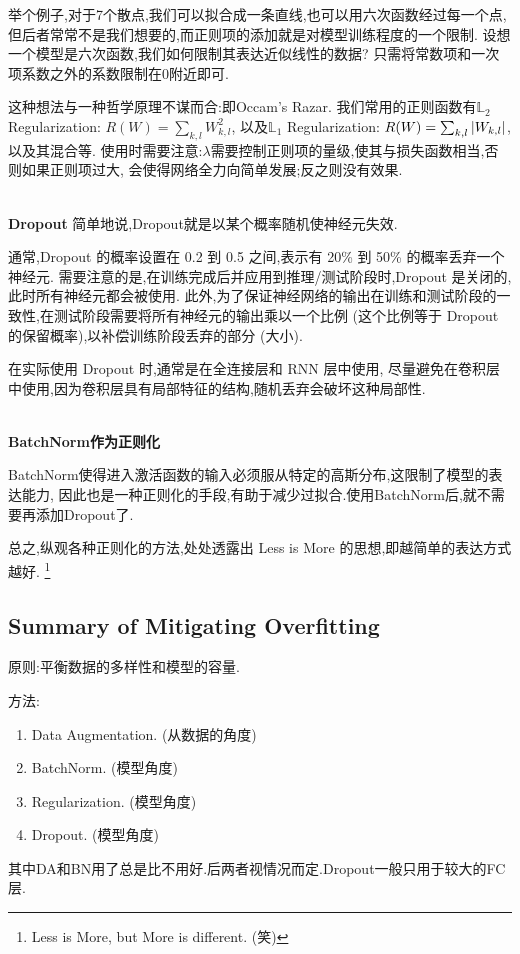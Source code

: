 举个例子,对于7个散点,我们可以拟合成一条直线,也可以用六次函数经过每一个点,
但后者常常不是我们想要的,而正则项的添加就是对模型训练程度的一个限制.
设想一个模型是六次函数,我们如何限制其表达近似线性的数据?
只需将常数项和一次项系数之外的系数限制在0附近即可.

这种想法与一种哲学原理不谋而合:即Occam's Razar.
我们常用的正则函数有$\mathbb L_2$ Regularization: $R(W) = \sum_{k,l}W_{k, l}^2$,
以及$\mathbb L_1$ Regularization: $R(W) = \sum_{k,l}\left|W_{k, l} \right|$,以及其混合等.
使用时需要注意:$\lambda$需要控制正则项的量级,使其与损失函数相当,否则如果正则项过大,
会使得网络全力向简单发展;反之则没有效果.

\textbf{\\Dropout}
简单地说,Dropout就是以某个概率随机使神经元失效.

通常,Dropout 的概率设置在 0.2 到 0.5 之间,表示有 20\% 到 50\% 的概率丢弃一个神经元.
需要注意的是,在训练完成后并应用到推理/测试阶段时,Dropout 是关闭的,此时所有神经元都会被使用.
此外,为了保证神经网络的输出在训练和测试阶段的一致性,在测试阶段需要将所有神经元的输出乘以一个比例
(这个比例等于 Dropout 的保留概率),以补偿训练阶段丢弃的部分 (大小).

在实际使用 Dropout 时,通常是在全连接层和 RNN 层中使用,
尽量避免在卷积层中使用,因为卷积层具有局部特征的结构,随机丢弃会破坏这种局部性.

\textbf{\\BatchNorm作为正则化}

BatchNorm使得进入激活函数的输入必须服从特定的高斯分布,这限制了模型的表达能力,
因此也是一种正则化的手段,有助于减少过拟合.使用BatchNorm后,就不需要再添加Dropout了.

总之,纵观各种正则化的方法,处处透露出 Less is More 的思想,即越简单的表达方式越好.
\footnote{Less is More, but More is different. (笑)}

\subsection{Summary of Mitigating Overfitting}
原则:平衡数据的多样性和模型的容量.

方法:
\begin{enumerate}
	\item Data Augmentation. (从数据的角度)
	\item BatchNorm. (模型角度)
	\item Regularization. (模型角度)
	\item Dropout. (模型角度)
\end{enumerate}

其中DA和BN用了总是比不用好.后两者视情况而定.Dropout一般只用于较大的FC层.